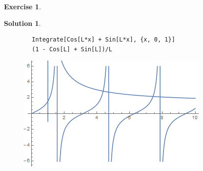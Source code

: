 \documentclass{article}
\theoremstyle{definition}
\newtheorem*{exer*}{Exercise}
\newtheorem*{sln*}{Solution}
\begin{document}
\begin{exer*}
\begin{enumerate}
\begin{sln*}
\begin{lstlisting}
	 	Integrate[Cos[L*x] + Sin[L*x], {x, 0, 1}]
	 	(1 - Cos[L] + Sin[L])/L
	 		\end{lstlisting}
	 		\begin{figure}[h!]
	 			\centering
	 			\includegraphics[scale=0.7]{pde_3_2.png}
	 		\end{figure}
	 	\end{sln*}
 	
 	
 	
 	
 	 
	 	\newpage
	 \end{enumerate}
 
\end{exer*}

\newpage 
\end{document}
